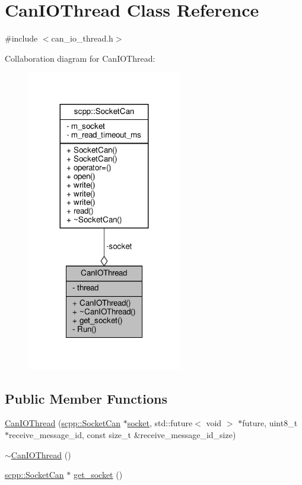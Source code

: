 \hypertarget{classCanIOThread}{}\section{Can\+I\+O\+Thread Class Reference}
\label{classCanIOThread}


{\ttfamily \#include $<$can\+\_\+io\+\_\+thread.\+h$>$}



Collaboration diagram for Can\+I\+O\+Thread\+:
\nopagebreak
\begin{figure}[H]
\begin{center}
\leavevmode
\includegraphics[width=191pt]{classCanIOThread__coll__graph}
\end{center}
\end{figure}
\subsection*{Public Member Functions}
\begin{DoxyCompactItemize}
\item 
\hyperlink{classCanIOThread_a5ab76331e5bd6ce26fcad85e8bd5d9f4}{Can\+I\+O\+Thread} (\hyperlink{classscpp_1_1SocketCan}{scpp\+::\+Socket\+Can} $\ast$\hyperlink{classCanIOThread_a4c0f06e7c73ea3afcb567ff7dbb41f30}{socket}, std\+::future$<$ void $>$ $\ast$future, uint8\+\_\+t $\ast$receive\+\_\+message\+\_\+id, const size\+\_\+t \&receive\+\_\+message\+\_\+id\+\_\+size)
\item 
\hyperlink{classCanIOThread_acbe9fb01fc351b5d0babe204ff086e5b}{$\sim$\+Can\+I\+O\+Thread} ()
\item 
\hyperlink{classscpp_1_1SocketCan}{scpp\+::\+Socket\+Can} $\ast$ \hyperlink{classCanIOThread_abd81d2bfe629d2abf8a3ee4e0d71c7e5}{get\+\_\+socket} ()
\end{DoxyCompactItemize}

